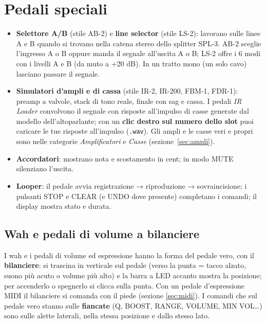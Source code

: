 \documentclass[11pt,a4paper]{article}
\begin{document}
\section{Pedali speciali}
\begin{itemize}
  \item \textbf{Selettore A/B} (stile AB-2) e \textbf{line selector} (stile LS-2): lavorano sulle linee A e B
        quando si trovano nella catena stereo dello splitter SPL-3. AB-2 sceglie l'ingresso A o B
        oppure manda il segnale all'uscita A o B; LS-2 offre i 6 modi con i livelli A e B (da muto a +20 dB).
        In un tratto mono (un solo cavo) lasciano passare il segnale.
  \item \textbf{Simulatori d'ampli e di cassa} (stile IR-2, IR-200, FBM-1, FDR-1): preamp a valvole,
        stack di tono reale, finale con sag e cassa. I pedali \emph{IR Loader} convolvono il segnale con
        risposte all'impulso di casse generate dal modello dell'altoparlante; con un \textbf{clic destro sul
        numero dello slot} puoi caricare le tue risposte all'impulso (\texttt{.wav}). Gli ampli e le casse veri
        e propri sono nelle categorie \emph{Amplificatori} e \emph{Casse} (sezione~\ref{sec:ampli}).
  \item \textbf{Accordatori}: mostrano nota e scostamento in cent; in modo MUTE silenziano l'uscita.
  \item \textbf{Looper}: il pedale avvia registrazione → riproduzione → sovraincisione; i pulsanti
        STOP e CLEAR (e UNDO dove presente) completano i comandi; il display mostra stato e durata.
\end{itemize}

\subsection{Wah e pedali di volume a bilanciere}
I wah e i pedali di volume ed espressione hanno la forma del pedale vero, con il \textbf{bilanciere}:
si trascina in verticale sul pedale (verso la punta = tacco alzato, suono più acuto o volume più alto) e
la barra a LED accanto mostra la posizione; per accenderlo o spegnerlo si clicca sulla punta. Con un
pedale d'espressione MIDI il bilanciere si comanda con il piede (sezione \ref{sec:midi}). I comandi che
sul pedale vero stanno sulle \textbf{fiancate} (Q, BOOST, RANGE, VOLUME, MIN VOL\dots) sono sulle
alette laterali, nella stessa posizione e dallo stesso lato.
\end{document}
